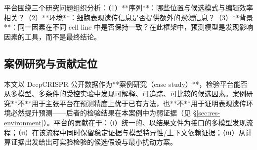 平台围绕三个研究问题组织分析：（1）**序列**：哪些位置与候选模式与编辑效率相关？（2）**环境**：细胞表观遗传信息是否提供额外的\emph{预测}信息？（3）**背景**：同一因素在不同 cell line 中是否保持一致？在此框架中，预测模型是发现影响因素的工具，而不是最终结论。

\subsection{案例研究与贡献定位}

本文以 DeepCRISPR 公开数据作为**案例研究（case study）**，检验平台能否从多模型、多条件的受控实验中发现可解释、可追踪、可比较的候选因素。案例研究**不**用于主张平台在预测精度上优于已有方法，也**不**用于证明表观遗传环境必然提升预测——后者的检验结果在本案例中为弱证据（见 \S\ref{sec:res-environment}）。平台的贡献在于：（i）统一的、以结果文件为接口的多模型发现流程；（ii）在该流程中同时保留稳定证据与模型特异性/上下文依赖证据；（iii）从计算证据出发给出可实验检验的候选假设与最小扰动方案。
